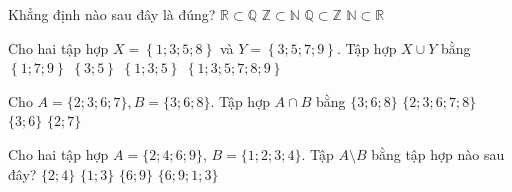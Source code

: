\begin{ex}%
	Khẳng định nào sau đây là đúng?
	\choice
	{$ \mathbb{R}\subset\mathbb{Q} $}
	{$ \mathbb{Z}\subset\mathbb{N} $}
	{$ \mathbb{Q}\subset\mathbb{Z} $}
	{\True $ \mathbb{N}\subset\mathbb{R} $}
\end{ex}
\begin{ex}%
	Cho hai tập hợp $X=\left\{1;3;5;8\right\}$ và $Y=\left\{3;5;7;9\right\}$. Tập hợp $X\cup Y$ bằng
	\choice
	{$\left\{1;7;9\right\}$}
	{$\left\{3;5\right\}$}
	{$\left\{1;3;5\right\}$}
	{\True $\left\{1;3;5;7;8;9\right\}$}
\end{ex}
\begin{ex}%
	Cho $A=\{2;3;6;7\}, B=\{3;6;8\}$. Tập hợp $A\cap B$ bằng
	\choice
	{$\{3;6;8\}$}
	{$\{2;3;6;7;8\}$}
	{\True $\{3;6\}$}
	{$\{2;7\}$}
\end{ex}
\begin{ex}%
	Cho hai tập hợp $A=\{2;4;6;9\}$, $B=\{1;2;3;4\}$. Tập $A \setminus B$ bằng tập hợp nào sau đây?
	\choice
	{$\{2;4\}$}
	{$\{1;3\}$}
	{\True $\{6;9\}$}
	{$\{6;9;1;3\}$}
\end{ex}

